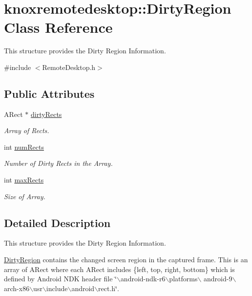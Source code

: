 \hypertarget{classknoxremotedesktop_1_1DirtyRegion}{\section{knoxremotedesktop\-:\-:\-Dirty\-Region \-Class \-Reference}
\label{classknoxremotedesktop_1_1DirtyRegion}
}


\-This structure provides the \-Dirty \-Region \-Information.  




{\ttfamily \#include $<$\-Remote\-Desktop.\-h$>$}

\subsection*{\-Public \-Attributes}
\begin{DoxyCompactItemize}
\item 
\-A\-Rect $\ast$ \hyperlink{classknoxremotedesktop_1_1DirtyRegion_a46d58ad2c718f79613f9ad1b02d64c3d}{dirty\-Rects}
\begin{DoxyCompactList}\small\item\em \-Array of \-Rects. \end{DoxyCompactList}\item 
int \hyperlink{classknoxremotedesktop_1_1DirtyRegion_a433b848a889223e6b404cec9e8db0c7d}{num\-Rects}
\begin{DoxyCompactList}\small\item\em \-Number of \-Dirty \-Rects in the \-Array. \end{DoxyCompactList}\item 
int \hyperlink{classknoxremotedesktop_1_1DirtyRegion_a65b638db44b5b39191e0d72123d9ccc8}{max\-Rects}
\begin{DoxyCompactList}\small\item\em \-Size of \-Array. \end{DoxyCompactList}\end{DoxyCompactItemize}


\subsection{\-Detailed \-Description}
\-This structure provides the \-Dirty \-Region \-Information. 

\hyperlink{classknoxremotedesktop_1_1DirtyRegion}{\-Dirty\-Region} contains the changed screen region in the captured frame. \-This is an array of \-A\-Rect where each \-A\-Rect includes \{left, top, right, bottom\} which is defined by \-Android \-N\-D\-K header file \char`\"{}$\backslash$android-\/ndk-\/r6$\backslash$platforms$\backslash$
 android-\/9$\backslash$arch-\/x86$\backslash$usr$\backslash$include$\backslash$android$\backslash$rect.\-h\char`\"{}.

